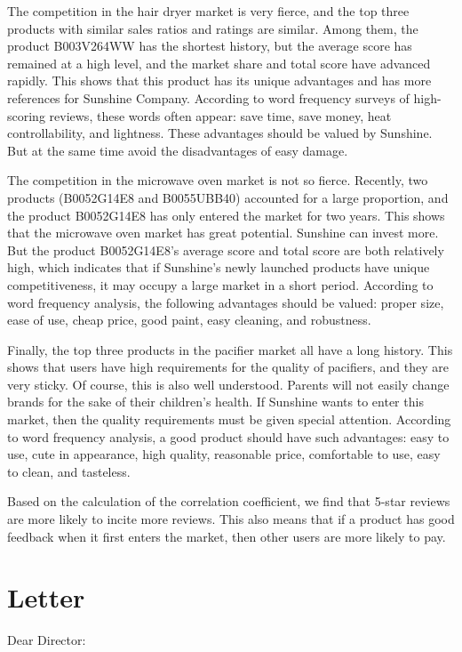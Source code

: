 \documentclass{mcmthesis}
\begin{document}
	The competition in the hair dryer market is very fierce, and the top three products with similar sales ratios and ratings are similar. Among them, the product B003V264WW has the shortest history, but the average score has remained at a high level, and the market share and total score have advanced rapidly. This shows that this product has its unique advantages and has more references for Sunshine Company. According to word frequency surveys of high-scoring reviews, these words often appear: save time, save money, heat controllability, and lightness. These advantages should be valued by Sunshine. But at the same time avoid the disadvantages of easy damage.
	
	The competition in the microwave oven market is not so fierce. Recently, two products (B0052G14E8 and B0055UBB40) accounted for a large proportion, and the product B0052G14E8 has only entered the market for two years. This shows that the microwave oven market has great potential. Sunshine can invest more. But the product B0052G14E8's average score and total score are both relatively high, which indicates that if Sunshine's newly launched products have unique competitiveness, it may occupy a large market in a short period. According to word frequency analysis, the following advantages should be valued: proper size, ease of use, cheap price, good paint, easy cleaning, and robustness.
	
	Finally, the top three products in the pacifier market all have a long history. This shows that users have high requirements for the quality of pacifiers, and they are very sticky. Of course, this is also well understood. Parents will not easily change brands for the sake of their children's health. If Sunshine wants to enter this market, then the quality requirements must be given special attention. According to word frequency analysis, a good product should have such advantages: easy to use, cute in appearance, high quality, reasonable price, comfortable to use, easy to clean, and tasteless.
	
	Based on the calculation of the correlation coefficient, we find that 5-star reviews are more likely to incite more reviews. This also means that if a product has good feedback when it first enters the market, then other users are more likely to pay.
	
	\newpage
	
	\section{Letter}
	\begin{flushleft}
		Dear Director:
	\end{flushleft}
\end{document}
